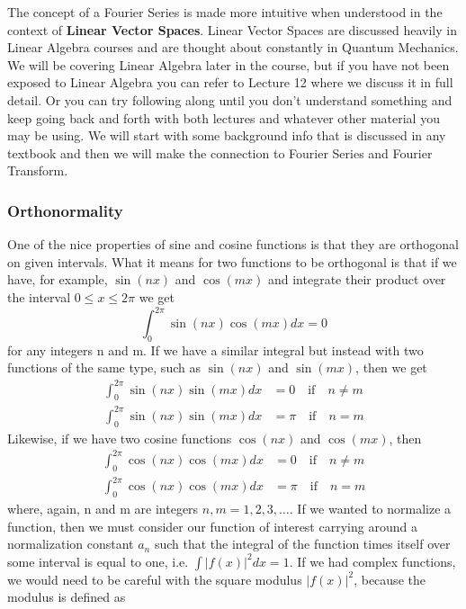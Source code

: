 \documentclass{article}
\newcommand{\be}{\begin{equation}}
\newcommand{\ee}{\end{equation}}
\begin{document}
The concept of a Fourier Series is made more intuitive when understood in the context of \textbf{Linear Vector Spaces}.
Linear Vector Spaces are discussed heavily in Linear Algebra courses and are thought about constantly in Quantum Mechanics.
We will be covering Linear Algebra later in the course, but if you have not been exposed to Linear Algebra you can refer to Lecture 12 where we discuss it in full detail.
Or you can try following along until you don't understand something and keep going back and forth with both lectures and whatever other material you may be using.
We will start with some background info that is discussed in any textbook and then we will make the connection to Fourier Series and Fourier Transform.

\subsubsection*{Orthonormality}
One of the nice properties of sine and cosine functions is that they are orthogonal on given intervals.
What it means for two functions to be orthogonal is that if we have, for example, $\sin(nx)$ and $\cos(mx)$ and integrate their product over the interval $0 \leq x \leq 2 \pi$ we get
\be \label{eq:sin_cos}
  \int_0^{2\pi} \sin(nx)\cos(mx) dx = 0
\ee
for any integers n and m.
If we have a similar integral but instead with two functions of the same type, such as $\sin(nx)$ and $\sin(mx)$, then we get
\be \label{eq:sin_sin_orth}
  \begin{split}
    \int_0^{2\pi} \sin(nx)\sin(mx) dx &= 0 \quad \text{if} \quad n \neq m \\
    \int_0^{2\pi} \sin(nx)\sin(mx) dx &= \pi \quad \text{if} \quad n = m
  \end{split}
\ee
Likewise, if we have two cosine functions $\cos(nx)$ and $\cos(mx)$, then
\be \label{eq:cos_cos_orth}
  \begin{split}
    \int_0^{2\pi} \cos(nx)\cos(mx) dx &= 0 \quad \text{if} \quad n \neq m \\
    \int_0^{2\pi} \cos(nx)\cos(mx) dx &= \pi \quad \text{if} \quad n = m
  \end{split}
\ee
where, again, n and m are integers $n,m = 1, 2, 3, \hdots$.
If we wanted to normalize a function, then we must consider our function of interest carrying around a normalization constant $a_n$ such that the integral of the function times itself over some interval is equal to one, i.e. $\int |f(x)|^2 dx = 1$.
If we had complex functions, we would need to be careful with the square modulus $|f(x)|^2$, because the modulus is defined as
\end{document}

